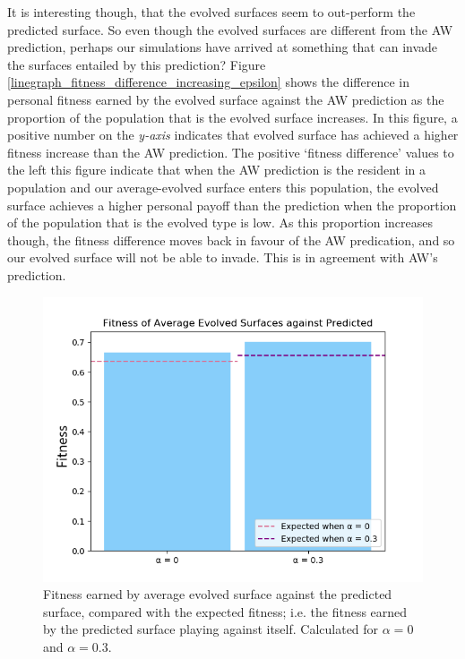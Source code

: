 \documentclass[11pt]{book}
\newcommand*{\np}{\par\noindent\newline}
\begin{document}
\np It is interesting though, that the evolved surfaces seem to out-perform the predicted surface.
So even though the evolved surfaces are different from the AW prediction, perhaps our simulations have arrived at something that can invade the surfaces entailed by this prediction?
Figure \ref{linegraph_fitness_difference_increasing_epsilon} shows the difference in personal fitness earned by the evolved surface against the AW prediction as the proportion of the population  that is the evolved surface increases.
In this figure, a positive number on the \textit{y-axis} indicates that evolved surface has achieved a higher fitness increase than the AW prediction.
The positive `fitness difference' values to the left this figure indicate that when the AW prediction is the resident in a population and our average-evolved surface enters this population,
the evolved surface achieves a higher personal payoff than the prediction when the proportion of the population that is the evolved type is low.
As this proportion increases though, the fitness difference moves back in favour of the AW predication, and so our evolved surface will not be able to invade.
This is in agreement with AW's prediction.
\begin{figure}
	\centering
	\includegraphics[scale=0.7]{resources/phenotype_barchart_fitness_earned_against_target_r_00_03.png}
	\caption{Fitness earned by average evolved surface against the predicted surface, compared with the expected fitness; i.e. the fitness earned by the predicted surface playing against itself. Calculated for $\alpha = 0$ and $\alpha = 0.3$.}
	\label{phenotype_barchart_fitness_earned_against_target_r_00_03}
\end{figure}
\end{document}
